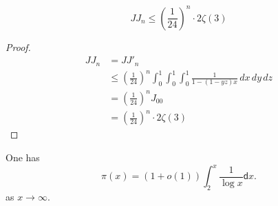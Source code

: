 \begin{theorem}\label{JJ_upper}
    \[ JJ_n \leqslant (\frac{1}{24})^n\cdot 2\zeta(3) \]
\end{theorem}
\begin{proof}
    \leanok
    \begin{align*}
        JJ_n &= JJ'_n \\
        &\leqslant (\frac{1}{24})^n \int_{0}^{1}\int_{0}^{1}\int_{0}^{1} \frac{1}{1-(1-yz)x} \, dx \, dy \, dz \\
        &= (\frac{1}{24})^n J_{00} \\
        &= (\frac{1}{24})^n \cdot 2\zeta(3)
    \end{align*}
\end{proof}

\begin{lemma}\label{pi_asymp}
  One has
  \[
  \pi(x) = \left(1 + o(1)\right)\int_2^{x}\frac{1}{\log x} \mathsf{d} x.
  \]
  as $x \to \infty$.
\end{lemma}
